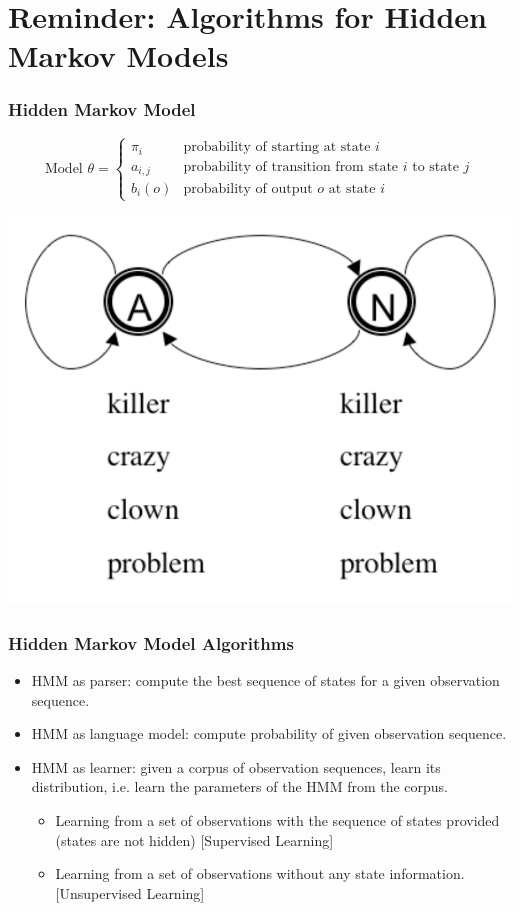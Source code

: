 
\section{Reminder: Algorithms for Hidden Markov Models}

\begin{frame}
\frametitle{Hidden Markov Model}
\[
\textrm{Model $\theta$} = \left\{ 
\begin{array}{ll} 
\pi_i & \textrm{probability of starting at state $i$} \\ 
a_{i,j} & \textrm{probability of transition from state $i$ to state $j$} \\ 
b_i(o) & \textrm{probability of output $o$ at state $i$}
\end{array} 
\right.\]

\begin{center}
\includegraphics[scale=.4]{figures/hmmfig}
\end{center}
\end{frame}

\begin{frame}
\frametitle{Hidden Markov Model Algorithms}
\begin{itemize}
\item HMM as parser: compute the best sequence of states for a given observation sequence.
\item HMM as language model: compute probability of given observation sequence.
\item HMM as learner: given a corpus of observation sequences, learn its distribution, i.e. learn the parameters of the HMM from the corpus.
\begin{itemize}
\item Learning from a set of observations with the sequence of states provided (states are not hidden) {\color{blue} [Supervised Learning]}
\item Learning from a set of observations without any state information. {\color{blue} [Unsupervised Learning]}
\end{itemize}
\end{itemize}
\end{frame}

